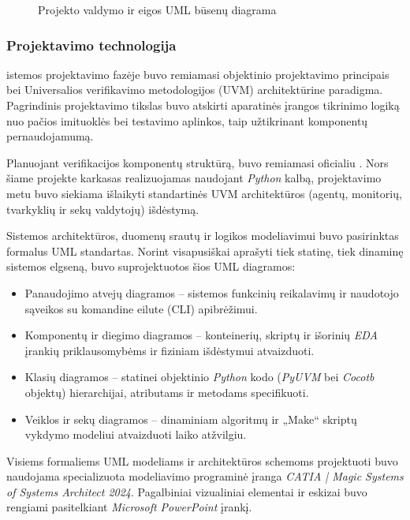 \begin{figure}[H]
	
	\caption{Projekto valdymo ir eigos UML būsenų diagrama}
	\label{fig:uml_state_project_workflow}
\end{figure}

\subsubsection{Projektavimo technologija}

istemos projektavimo fazėje buvo remiamasi objektinio projektavimo principais bei Universalios verifikavimo metodologijos (UVM) architektūrine paradigma. Pagrindinis projektavimo tikslas buvo atskirti aparatinės įrangos tikrinimo logiką nuo pačios imituoklės bei testavimo aplinkos, taip užtikrinant komponentų pernaudojamumą. 

Planuojant verifikacijos komponentų struktūrą, buvo remiamasi oficialiu . Nors šiame projekte karkasas realizuojamas naudojant \textit{Python} kalbą, projektavimo metu buvo siekiama išlaikyti standartinės UVM architektūros (agentų, monitorių, tvarkyklių ir sekų valdytojų) išdėstymą.

Sistemos architektūros, duomenų srautų ir logikos modeliavimui buvo pasirinktas formalus UML standartas. Norint visapusiškai aprašyti tiek statinę, tiek dinaminę sistemos elgseną, buvo suprojektuotos šios UML diagramos:
\begin{itemize}
	\item Panaudojimo atvejų diagramos -- sistemos funkcinių reikalavimų ir naudotojo sąveikos su komandine eilute (CLI) apibrėžimui.
	\item Komponentų ir diegimo diagramos -- konteinerių, skriptų ir išorinių \textit{EDA} įrankių priklausomybėms ir fiziniam išdėstymui atvaizduoti.
	\item Klasių diagramos -- statinei objektinio \textit{Python} kodo (\textit{PyUVM} bei \textit{Cocotb} objektų) hierarchijai, atributams ir metodams specifikuoti.
	\item Veiklos ir sekų diagramos -- dinaminiam algoritmų ir „Make“ skriptų vykdymo modeliui atvaizduoti laiko atžvilgiu.
\end{itemize}

Visiems formaliems UML modeliams ir architektūros schemoms projektuoti buvo naudojama specializuota modeliavimo programinė įranga \textit{CATIA | Magic Systems of Systems Architect 2024}. Pagalbiniai vizualiniai elementai ir eskizai buvo rengiami pasitelkiant \textit{Microsoft PowerPoint} įrankį.

